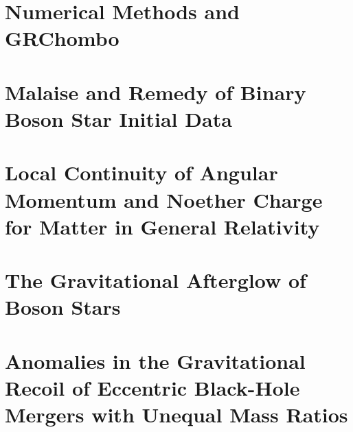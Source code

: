 \documentclass[11pt]{report}  %
\numberwithin{equation}{section}
\begin{document}




\chapter{Numerical Methods and {\sc GRChombo}}









 \chapter{Malaise and Remedy of Binary Boson Star Initial Data}

 





 \chapter{Local Continuity of Angular Momentum and Noether Charge for
 Matter in General Relativity}




 \chapter{The Gravitational Afterglow of Boson Stars}

 

  \chapter{Anomalies in the Gravitational Recoil of Eccentric Black-Hole Mergers with Unequal
Mass Ratios}










\end{document}
